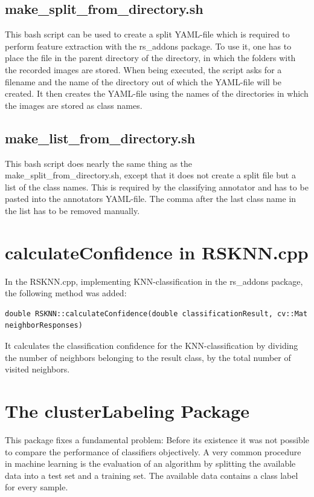 \documentclass[main.tex]{subfiles}
\begin{document}
\subsection{make\_split\_from\_directory.sh} 
This bash script can be used to create a split YAML-file which is required to perform feature extraction with the rs\_addons package. To use it, one has to place the file in the parent directory of the directory, in which the folders with the recorded images are stored. When being executed, the script asks for a filename and the name of the directory out of which the YAML-file will be created. It then creates the YAML-file using the names of the directories in which the images are stored as class names.

\subsection{make\_list\_from\_directory.sh}
This bash script does nearly the same thing as the make\_split\_from\_directory.sh, except that it does not create a split file but a list of the class names. This is required by the classifying annotator and has to be pasted into the annotators YAML-file. The comma after the last class name in the list has to be removed manually.

\section{calculateConfidence in RSKNN.cpp}
In the RSKNN.cpp, implementing KNN-classification in the rs\_addons package, the following method was added:

\begin{lstlisting}
double RSKNN::calculateConfidence(double classificationResult, cv::Mat neighborResponses)
\end{lstlisting}

It calculates the classification confidence for the KNN-classification by dividing the number of neighbors belonging to the result class, by the total number of visited neighbors. 

\section{The clusterLabeling Package}
This package fixes a fundamental problem: Before its existence it was not possible to compare the performance of classifiers objectively. A very common procedure in machine learning is the evaluation of an algorithm by splitting the available data into a test set and a training set. The available data contains a class label for every sample.\\
\end{document}
